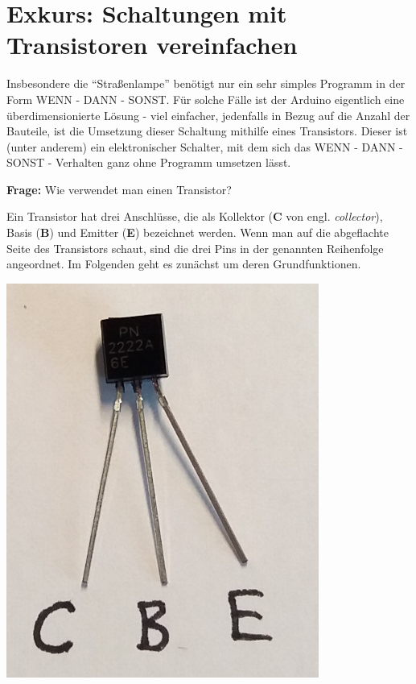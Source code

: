 \newpage
\section{Exkurs: Schaltungen mit Transistoren vereinfachen}\label{sec:transistor}

Insbesondere die \enquote{Straßenlampe} benötigt nur ein sehr simples Programm in der Form WENN - DANN - SONST. Für solche Fälle ist der Arduino eigentlich eine überdimensionierte Lösung - viel einfacher, jedenfalls in Bezug auf die Anzahl der Bauteile, ist die Umsetzung dieser Schaltung mithilfe eines Transistors. Dieser ist (unter anderem) ein elektronischer Schalter, mit dem sich das WENN - DANN - SONST - Verhalten ganz ohne Programm umsetzen lässt.

\begin{ziel}
	\textbf{Frage:} Wie verwendet man einen Transistor?
\end{ziel}

\medskip
\begin{minipage}{0.85\textwidth}
	Ein Transistor hat drei Anschlüsse, die als Kollektor (\textbf{C} von engl. \emph{collector}), Basis (\textbf{B}) und Emitter (\textbf{E}) bezeichnet werden. Wenn man auf die abgeflachte Seite des Transistors schaut, sind die drei Pins in der genannten Reihenfolge angeordnet. Im Folgenden geht es zunächst um deren Grundfunktionen.
\end{minipage}
\hfill
\begin{minipage}{0.13\textwidth}
	\centering
	\includegraphics[width=0.77\textwidth]{./pics/transistor.jpg}
\end{minipage}

